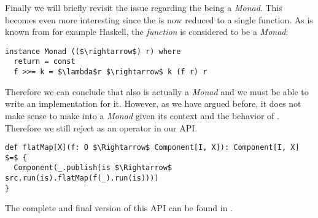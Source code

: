 Finally we will briefly revisit the issue regarding the \comp being a \textit{Monad}. This becomes even more interesting since the \comp is now reduced to a single function. As is known from for example Haskell, the \textit{function} is considered to be a \textit{Monad}:

\begin{minipage}{\linewidth}
\begin{lstlisting}[style=InlineHaskellStyle]
instance Monad (($\rightarrow$) r) where
  return = const
  f >>= k = $\lambda$r $\rightarrow$ k (f r) r
\end{lstlisting}
\end{minipage}

Therefore we can conclude that also \comp is actually a \textit{Monad} and we must be able to write an implementation for it. However, as we have argued before, it does not make sense to make \comp into a \textit{Monad} given its context and the behavior of . Therefore we still reject  as an operator in our API.

\begin{minipage}{\linewidth}
\begin{lstlisting}[style=InlineScalaStyle]
def flatMap[X](f: O $\Rightarrow$ Component[I, X]): Component[I, X] $=$ {
  Component(_.publish(is $\Rightarrow$ src.run(is).flatMap(f(_).run(is))))
}
\end{lstlisting}
\end{minipage}

The complete and final version of this API can be found in .
